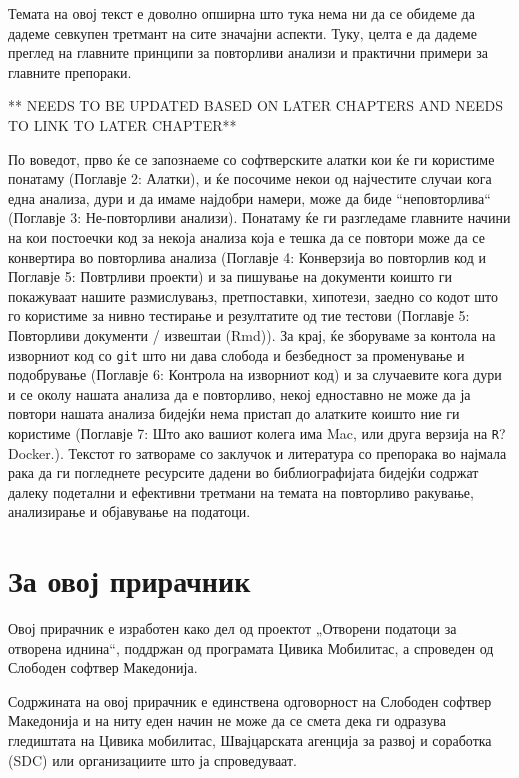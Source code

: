 \documentclass[
]{book}
\begin{document}
Темата на овој текст е доволно опширна што тука нема ни да се обидеме да дадеме севкупен третмант на сите значајни аспекти. Туку, целта е да дадеме преглед на главните принципи за повторливи анализи и практични примери за главните препораки.

** NEEDS TO BE UPDATED BASED ON LATER CHAPTERS AND NEEDS TO LINK TO LATER CHAPTER**

По воведот, прво ќе се запознаеме со софтверските алатки кои ќе ги користиме понатаму (Поглавје 2: Алатки), и ќе посочиме некои од најчестите случаи кога една анализа, дури и да имаме најдобри намери, може да биде ``неповторлива`` (Поглавје 3: Не-повторливи анализи). Понатаму ќе ги разгледаме главните начини на кои постоечки код за некоја анализа која е тешка да се повтори може да се конвертира во повторлива анализа (Поглавје 4: Конверзија во повторлив код и Поглавје 5: Повтрливи проекти) и за пишување на документи коишто ги покажуваат нашите размислувањз, претпоставки, хипотези, заедно со кодот што го користиме за нивно тестирање и резултатите од тие тестови (Поглавје 5: Повторливи документи / извештаи (Rmd)). За крај, ќе зборуваме за контола на изворниот код со \texttt{git} што ни дава слобода и безбедност за променување и подобрување (Поглавје 6: Контрола на изворниот код) и за случаевите кога дури и се околу нашата анализа да е повторливо, некој едноставно не може да ја повтори нашата анализа бидејќи нема пристап до алатките коишто ние ги користиме (Поглавје 7: Што ако вашиот колега има Mac, или друга верзија на \texttt{R}? Docker.). Текстот го затвораме со заклучок и литература со препорака во најмала рака да ги погледнете ресурсите дадени во библиографијата бидејќи содржат далеку подетални и ефективни третмани на темата на повторливо ракување, анализирање и објавување на податоци.

\hypertarget{ux437ux430-ux43eux432ux43eux458-ux43fux440ux438ux440ux430ux447ux43dux438ux43a}{%
\section{За овој прирачник}\label{ux437ux430-ux43eux432ux43eux458-ux43fux440ux438ux440ux430ux447ux43dux438ux43a}}

Овој прирачник е изработен како дел од проектот „Отворени податоци за отворена иднина``, поддржан од програмата Цивика Мобилитас, а спроведен од Слободен софтвер Македонија.

Содржината на овој прирачник е единствена одговорност на Слободен софтвер Македонија и на ниту еден начин не може да се смета дека ги одразува гледиштата на Цивика мобилитас, Швајцарската агенција за развој и соработка (SDC) или организациите што ја спроведуваат.
\end{document}
